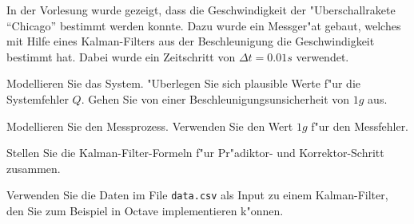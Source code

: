 In der Vorlesung wurde gezeigt, dass die Geschwindigkeit der "Uberschallrakete
``Chicago'' bestimmt werden konnte. Dazu wurde ein Messger"at gebaut,
welches mit Hilfe eines Kalman-Filters aus der Beschleunigung die
Geschwindigkeit bestimmt hat. Dabei wurde ein Zeitschritt von $\Delta t=0.01s$
verwendet.
\begin{teilaufgaben}
\item Modellieren Sie das System.
"Uberlegen Sie sich plausible Werte f"ur die Systemfehler $Q$.
Gehen Sie von einer Beschleunigungsunsicherheit von $1g$
aus.
\item Modellieren Sie den Messprozess. Verwenden Sie den Wert $1g$ f"ur
den Messfehler.
\item Stellen Sie die Kalman-Filter-Formeln f"ur Pr"adiktor- und
Korrektor-Schritt zusammen.
\item Verwenden Sie die Daten im File {\tt data.csv} als Input zu einem
Kalman-Filter, den Sie zum Beispiel in Octave implementieren k"onnen.
\end{teilaufgaben}

